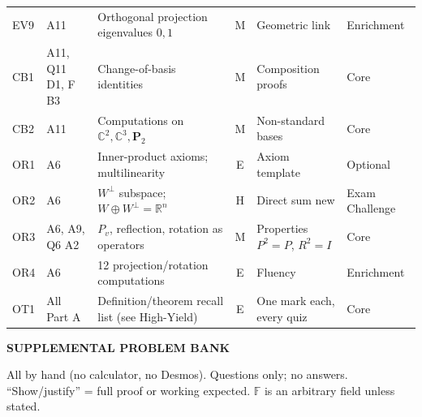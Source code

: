 \documentclass[9pt]{article}
\newcommand{\secn}[1]{\vspace{5pt}\par\noindent\begin{tcolorbox}[colback=NAVY,colframe=NAVY,boxrule=0pt,arc=2pt,left=5pt,top=1pt,bottom=1pt]\color{white}\bfseries\MakeUppercase{#1}\end{tcolorbox}\nopagebreak}
\begin{document}
{\begin{longtable}{@{}l p{2.6cm} p{5.2cm} c p{3.9cm} p{1.7cm}@{}}
EV9 & A11 & Orthogonal projection eigenvalues $0,1$ & M & Geometric link & Enrichment\\
CB1 & A11, Q11 D1, F B3 & Change-of-basis identities & M & Composition proofs & Core\\
CB2 & A11 & Computations on $\mathbb C^2,\mathbb C^3,\mathbf P_2$ & M & Non-standard bases & Core\\
OR1 & A6 & Inner-product axioms; multilinearity & E & Axiom template & Optional\\
OR2 & A6 & $W^\perp$ subspace; $W\oplus W^\perp=\mathbb R^n$ & H & Direct sum new & Exam Challenge\\
OR3 & A6, A9, Q6 A2 & $P_v$, reflection, rotation as operators & M & Properties $P^2=P$, $R^2=I$ & Core\\
OR4 & A6 & 12 projection/rotation computations & E & Fluency & Enrichment\\
OT1 & All Part A & Definition/theorem recall list (see High-Yield) & E & One mark each, every quiz & Core\\
\bottomrule\end{longtable}}\secn{Supplemental Problem Bank}
All by hand (no calculator, no Desmos). Questions only; no answers. ``Show/justify'' = full proof or working expected. $\mathbb F$ is an arbitrary field unless stated.
\end{document}
